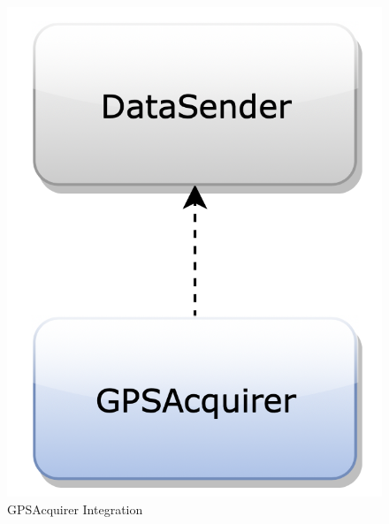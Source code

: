 \begin{figure}[H]
\begin{center}
        \begin{minipage}[c]{.40\textwidth}
	\centering
\includegraphics[scale=0.35]{Images/IntegrationPlanImages/fig9.png}
\caption{GPSAcquirer Integration}
        \end{minipage}%
        \hspace{10mm}%
        \begin{minipage}[c]{.40\textwidth}
	\centering

\end{minipage}
\end{center}
\end{figure}
